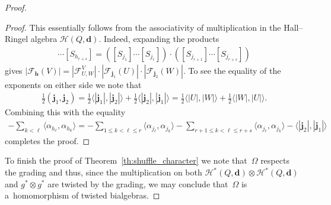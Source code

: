 \documentclass[11pt]{article}
\numberwithin{equation}{section}
\begin{document}
\begin{proof}
\begin{proof}
This essentially follows from the associativity of multiplication in the Hall--Ringel algebra
$\mathcal{H}(Q,\mathbf{d})$.
Indeed, expanding the products
\begin{gather*}
[S_{h_1}]\cdots[S_{h_{r+s}}]=([S_{j_1}]\cdots[S_{j_r}])\cdot([S_{j_{r+1}}]\cdots[S_{j_{r+s}}])
\end{gather*}
gives
$|\mathcal{F}_\mathbf{h}(V)|=|\mathcal{F}_{U,W}^V|\cdot|\mathcal{F}_{\mathbf{j}_1}(U)|\cdot|\mathcal{F}_{\mathbf{j}_2}(W)|$.
To see the equality of the exponents on either side we note that
\begin{gather*}
\frac{1}{2}(\mathbf{j}_1,\mathbf{j}_2)
=\frac{1}{2}\langle|\mathbf{j}_1|,|\mathbf{j}_2|\rangle+\frac{1}{2}\langle|\mathbf{j}_2|,|\mathbf{j}_1|\rangle
=\frac{1}{2}\langle|U|,|W|\rangle+\frac{1}{2}\langle|W|,|U|\rangle.
\end{gather*}
Combining this with the equality
\begin{gather*}
-\sum\limits_{k<\ell}\langle \alpha_{h_\ell},\alpha_{h_k}\rangle=-\sum\limits_{1\le k<\ell\le r}\langle
\alpha_{j_\ell},\alpha_{j_k}\rangle-\sum\limits_{r+1\le k<\ell\le r+s}\langle
\alpha_{j_\ell},\alpha_{j_k}\rangle-\langle|\mathbf{j}_2|,|\mathbf{j}_1|\rangle
\end{gather*}
completes the proof.
\end{proof}

To f\/inish the proof of Theorem~\ref{th:shuffle_character} we note that~$\Omega$ respects the grading and thus, since the
multiplication on both $\mathcal{H}^*(Q,\mathbf{d})\otimes\mathcal{H}^*(Q,\mathbf{d})$ and $g^*\otimes g^*$ are twisted
by the grading, we may conclude that~$\Omega$ is a~homomorphism of twisted bialgebras.
\end{proof}
\end{document}
